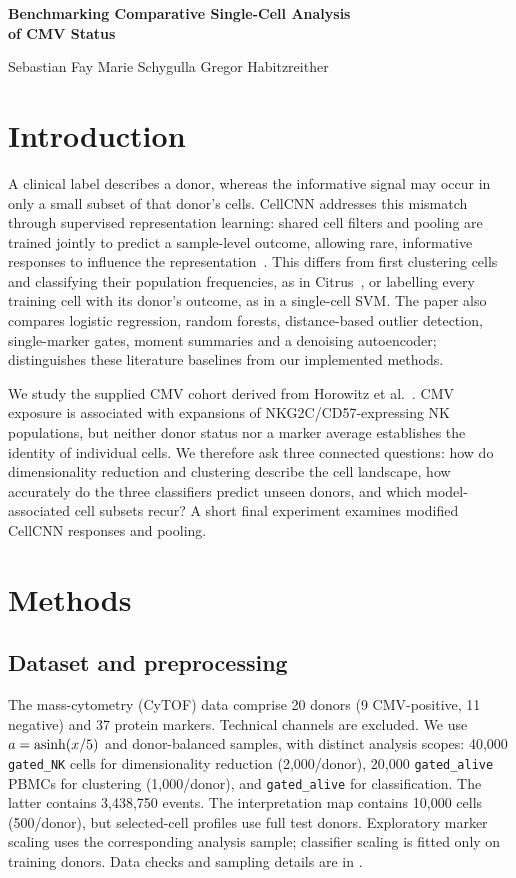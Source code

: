 \documentclass[11pt,a4paper]{article}
\begin{document}
\begin{center}
{\Large\bfseries Benchmarking Comparative Single-Cell Analysis\\of CMV Status\par}
\vspace{3pt}
Sebastian Fay \quad Marie Schygulla \quad Gregor Habitzreither
\end{center}
\vspace{-6pt}

\section{Introduction}
A clinical label describes a donor, whereas the informative signal may occur in only a small subset of that donor's cells. CellCNN addresses this mismatch through supervised representation learning: shared cell filters and pooling are trained jointly to predict a sample-level outcome, allowing rare, informative responses to influence the representation~\cite{cellcnn}. This differs from first clustering cells and classifying their population frequencies, as in Citrus~\cite{citrus}, or labelling every training cell with its donor's outcome, as in a single-cell SVM. The paper also compares logistic regression, random forests, distance-based outlier detection, single-marker gates, moment summaries and a denoising autoencoder;  distinguishes these literature baselines from our implemented methods.

We study the supplied CMV cohort derived from Horowitz et al.~\cite{horowitz}. CMV exposure is associated with expansions of NKG2C/CD57-expressing NK populations, but neither donor status nor a marker average establishes the identity of individual cells. We therefore ask three connected questions: how do dimensionality reduction and clustering describe the cell landscape, how accurately do the three classifiers predict unseen donors, and which model-associated cell subsets recur? A short final experiment examines modified CellCNN responses and pooling.

\section{Methods}
\subsection{Dataset and preprocessing}
The mass-cytometry (CyTOF) data comprise 20 donors (9 CMV-positive, 11 negative) and 37 protein markers. Technical channels are excluded. We use $a=\operatorname{asinh}(x/5)$ and donor-balanced samples, with distinct analysis scopes: 40,000 \texttt{gated\_NK} cells for dimensionality reduction (2,000/donor), 20,000 \texttt{gated\_alive} PBMCs for clustering (1,000/donor), and \texttt{gated\_alive} for classification. The latter contains 3,438,750 events. The interpretation map contains 10,000 cells (500/donor), but selected-cell profiles use full test donors. Exploratory marker scaling uses the corresponding analysis sample; classifier scaling is fitted only on training donors. Data checks and sampling details are in .
\end{document}
